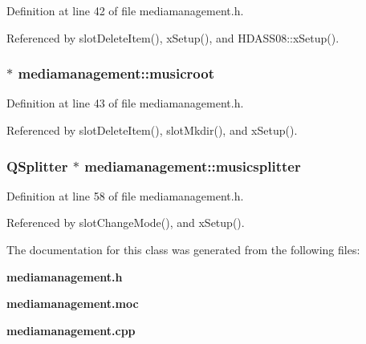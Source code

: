 Definition at line 42 of file mediamanagement.h.

Referenced by slot\-Delete\-Item(), x\-Setup(), and HDASS08::x\-Setup().
\subsubsection{$\ast$ {\bf mediamanagement::musicroot}}\label{classmediamanagement_mediamanagemento4}




Definition at line 43 of file mediamanagement.h.

Referenced by slot\-Delete\-Item(), slot\-Mkdir(), and x\-Setup().
\subsubsection{\setlength{\rightskip}{0pt plus 5cm}QSplitter $\ast$ {\bf mediamanagement::musicsplitter}\hspace{0.3cm}{\tt  [private]}}\label{classmediamanagement_mediamanagementr1}




Definition at line 58 of file mediamanagement.h.

Referenced by slot\-Change\-Mode(), and x\-Setup().

The documentation for this class was generated from the following files:\begin{CompactItemize}
\item 
{\bf mediamanagement.h}\item 
{\bf mediamanagement.moc}\item 
{\bf mediamanagement.cpp}\end{CompactItemize}
